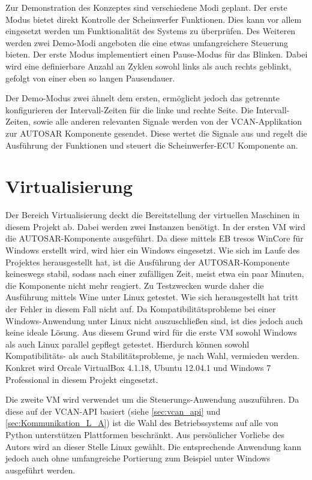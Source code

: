 \documentclass[
  a4paper,					    %
  twoside,
  DIV=calc,     				%
  bibliography=totoc,
  cleardoublepage=empty,
  ngerman,     					%
  final       					%
]{scrbook}
\begin{document}
Zur Demonstration des Konzeptes sind verschiedene Modi geplant. Der erste Modus bietet direkt Kontrolle der Scheinwerfer Funktionen. Dies kann vor allem eingesetzt werden um Funktionalität des Systems zu überprüfen. Des Weiteren werden zwei Demo-Modi angeboten die eine etwas umfangreichere Steuerung bieten. Der erste Modus implementiert einen Pause-Modus für das Blinken. Dabei wird eine definierbare Anzahl an Zyklen sowohl links als auch rechts geblinkt, gefolgt von einer eben so langen Pausendauer.

Der Demo-Modus zwei ähnelt dem ersten, ermöglicht jedoch das getrennte konfigurieren der Intervall-Zeiten für die linke und rechte Seite. Die Intervall-Zeiten, sowie alle anderen relevanten Signale werden von der VCAN-Applikation zur AUTOSAR Komponente gesendet. Diese wertet die Signale aus und regelt die Ausführung der Funktionen und steuert die Scheinwerfer-ECU Komponente an.




\section{Virtualisierung}
\label{sec:Virtualisierung_Umgesetzt}
Der Bereich Virtualisierung deckt die Bereitstellung der virtuellen Maschinen in diesem Projekt ab. Dabei werden zwei Instanzen benötigt. In der ersten VM wird die AUTOSAR-Komponente ausgeführt. Da diese mittels EB tresos WinCore für Windows erstellt wird, wird hier ein Windows eingesetzt. Wie sich im Laufe des Projektes herausgestellt hat, ist die Ausführung der AUTOSAR-Komponente keineswegs stabil, sodass nach einer zufälligen Zeit, meist etwa ein paar Minuten, die Komponente nicht mehr reagiert. Zu Testzwecken wurde daher die Ausführung mittels Wine unter Linux getestet. Wie sich herausgestellt hat tritt der Fehler in diesem Fall nicht auf. Da Kompatibilitätsprobleme bei einer Windows-Anwendung unter Linux nicht auszuschließen sind, ist dies jedoch auch keine ideale Lösung. Aus diesem Grund wird für die erste VM sowohl Windows als auch Linux parallel gepflegt getestet. Hierdurch können sowohl Kompatibilitäts- als auch Stabilitätsprobleme, je nach Wahl, vermieden werden. Konkret wird Orcale VirtualBox 4.1.18, Ubuntu 12.04.1 und Windows 7 Professional in diesem Projekt eingesetzt.

Die zweite VM wird verwendet um die Steuerungs-Anwendung auszuführen. Da diese auf der VCAN-API basiert (siehe \ref{sec:vcan_api} und \ref{sec:Kommunikation_L_A}) ist die Wahl des Betriebssystems auf alle von Python unterstützen Plattformen beschränkt. Aus persönlicher Vorliebe des Autors wird an dieser Stelle Linux gewählt. Die entsprechende Anwendung kann jedoch auch ohne umfangreiche Portierung zum Beispiel unter Windows ausgeführt werden.
\end{document}
